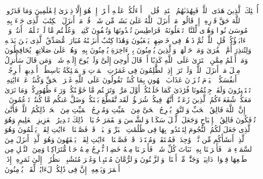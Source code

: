 \stopbuffer%
\startbuffer[\q:6:90]
أُو۟لَٰۤئِكَ ٱلَّذِینَ هَدَى ٱللَّهُۖ فَبِهُدَىٰهُمُ ٱقۡتَدِهۡۗ قُل لَّاۤ أَسۡءَلُكُمۡ عَلَیۡهِ أَجۡرًاۖ إِنۡ هُوَ إِلَّا ذِكۡرَىٰ لِلۡعَٰلَمِینَ%
\stopbuffer%
\startbuffer[\q:6:91]
وَمَا قَدَرُوا۟ ٱللَّهَ حَقَّ قَدۡرِهِۦۤ إِذۡ قَالُوا۟ مَاۤ أَنزَلَ ٱللَّهُ عَلَىٰ بَشَرࣲ مِّن شَیۡءࣲۗ قُلۡ مَنۡ أَنزَلَ ٱلۡكِتَٰبَ ٱلَّذِی جَاۤءَ بِهِۦ مُوسَىٰ نُورࣰا وَهُدࣰى لِّلنَّاسِۖ تَجۡعَلُونَهُۥ قَرَاطِیسَ تُبۡدُونَهَا وَتُخۡفُونَ كَثِیرࣰاۖ وَعُلِّمۡتُم مَّا لَمۡ تَعۡلَمُوۤا۟ أَنتُمۡ وَلَاۤ ءَابَاۤؤُكُمۡۖ قُلِ ٱللَّهُۖ ثُمَّ ذَرۡهُمۡ فِی خَوۡضِهِمۡ یَلۡعَبُونَ%
\stopbuffer%
\startbuffer[\q:6:92]
وَهَٰذَا كِتَٰبٌ أَنزَلۡنَٰهُ مُبَارَكࣱ مُّصَدِّقُ ٱلَّذِی بَیۡنَ یَدَیۡهِ وَلِتُنذِرَ أُمَّ ٱلۡقُرَىٰ وَمَنۡ حَوۡلَهَاۚ وَٱلَّذِینَ یُؤۡمِنُونَ بِٱلۡءَاخِرَةِ یُؤۡمِنُونَ بِهِۦۖ وَهُمۡ عَلَىٰ صَلَاتِهِمۡ یُحَافِظُونَ%
\stopbuffer%
\startbuffer[\q:6:93]
وَمَنۡ أَظۡلَمُ مِمَّنِ ٱفۡتَرَىٰ عَلَى ٱللَّهِ كَذِبًا أَوۡ قَالَ أُوحِیَ إِلَیَّ وَلَمۡ یُوحَ إِلَیۡهِ شَیۡءࣱ وَمَن قَالَ سَأُنزِلُ مِثۡلَ مَاۤ أَنزَلَ ٱللَّهُۗ وَلَوۡ تَرَىٰۤ إِذِ ٱلظَّٰلِمُونَ فِی غَمَرَٰتِ ٱلۡمَوۡتِ وَٱلۡمَلَٰۤئِكَةُ بَاسِطُوۤا۟ أَیۡدِیهِمۡ أَخۡرِجُوۤا۟ أَنفُسَكُمُۖ ٱلۡیَوۡمَ تُجۡزَوۡنَ عَذَابَ ٱلۡهُونِ بِمَا كُنتُمۡ تَقُولُونَ عَلَى ٱللَّهِ غَیۡرَ ٱلۡحَقِّ وَكُنتُمۡ عَنۡ ءَایَٰتِهِۦ تَسۡتَكۡبِرُونَ%
\stopbuffer%
\startbuffer[\q:6:94]
وَلَقَدۡ جِئۡتُمُونَا فُرَٰدَىٰ كَمَا خَلَقۡنَٰكُمۡ أَوَّلَ مَرَّةࣲ وَتَرَكۡتُم مَّا خَوَّلۡنَٰكُمۡ وَرَاۤءَ ظُهُورِكُمۡۖ وَمَا نَرَىٰ مَعَكُمۡ شُفَعَاۤءَكُمُ ٱلَّذِینَ زَعَمۡتُمۡ أَنَّهُمۡ فِیكُمۡ شُرَكَٰۤؤُا۟ۚ لَقَد تَّقَطَّعَ بَیۡنَكُمۡ وَضَلَّ عَنكُم مَّا كُنتُمۡ تَزۡعُمُونَ%
\stopbuffer%
\startbuffer[\q:6:95]
۞ إِنَّ ٱللَّهَ فَالِقُ ٱلۡحَبِّ وَٱلنَّوَىٰۖ یُخۡرِجُ ٱلۡحَیَّ مِنَ ٱلۡمَیِّتِ وَمُخۡرِجُ ٱلۡمَیِّتِ مِنَ ٱلۡحَیِّۚ ذَٰلِكُمُ ٱللَّهُۖ فَأَنَّىٰ تُؤۡفَكُونَ%
\stopbuffer%
\startbuffer[\q:6:96]
فَالِقُ ٱلۡإِصۡبَاحِ وَجَعَلَ ٱلَّیۡلَ سَكَنࣰا وَٱلشَّمۡسَ وَٱلۡقَمَرَ حُسۡبَانࣰاۚ ذَٰلِكَ تَقۡدِیرُ ٱلۡعَزِیزِ ٱلۡعَلِیمِ%
\stopbuffer%
\startbuffer[\q:6:97]
وَهُوَ ٱلَّذِی جَعَلَ لَكُمُ ٱلنُّجُومَ لِتَهۡتَدُوا۟ بِهَا فِی ظُلُمَٰتِ ٱلۡبَرِّ وَٱلۡبَحۡرِۗ قَدۡ فَصَّلۡنَا ٱلۡءَایَٰتِ لِقَوۡمࣲ یَعۡلَمُونَ%
\stopbuffer%
\startbuffer[\q:6:98]
وَهُوَ ٱلَّذِیۤ أَنشَأَكُم مِّن نَّفۡسࣲ وَٰحِدَةࣲ فَمُسۡتَقَرࣱّ وَمُسۡتَوۡدَعࣱۗ قَدۡ فَصَّلۡنَا ٱلۡءَایَٰتِ لِقَوۡمࣲ یَفۡقَهُونَ%
\stopbuffer%
\startbuffer[\q:6:99]
وَهُوَ ٱلَّذِیۤ أَنزَلَ مِنَ ٱلسَّمَاۤءِ مَاۤءࣰ فَأَخۡرَجۡنَا بِهِۦ نَبَاتَ كُلِّ شَیۡءࣲ فَأَخۡرَجۡنَا مِنۡهُ خَضِرࣰا نُّخۡرِجُ مِنۡهُ حَبࣰّا مُّتَرَاكِبࣰا وَمِنَ ٱلنَّخۡلِ مِن طَلۡعِهَا قِنۡوَانࣱ دَانِیَةࣱ وَجَنَّٰتࣲ مِّنۡ أَعۡنَابࣲ وَٱلزَّیۡتُونَ وَٱلرُّمَّانَ مُشۡتَبِهࣰا وَغَیۡرَ مُتَشَٰبِهٍۗ ٱنظُرُوۤا۟ إِلَىٰ ثَمَرِهِۦۤ إِذَاۤ أَثۡمَرَ وَیَنۡعِهِۦۤۚ إِنَّ فِی ذَٰلِكُمۡ لَءَایَٰتࣲ لِّقَوۡمࣲ یُؤۡمِنُونَ%
